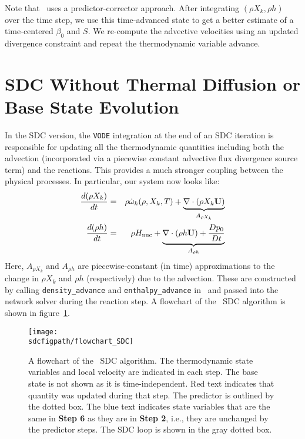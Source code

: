 Note that \maestro\ uses a predictor-corrector approach.  After integrating $(\rho X_k,\rho h)$ over
the time step, we use this time-advanced state to get a better estimate of a time-centered $\beta_0$
and $S$.  We re-compute the advective velocities using an updated divergence constraint and repeat 
the thermodynamic variable advance.

\section{SDC Without Thermal Diffusion or Base State Evolution}
In the SDC version, the {\tt VODE} integration at the end of an SDC
iteration is responsible for updating all the thermodynamic quantities
including both the advection (incorporated via a piecewise constant advective 
flux divergence source term) and the reactions.  This provides a much stronger coupling between
the physical processes.  In particular, our system now looks like:
\begin{eqnarray}
\frac{d(\rho X_k)}{dt} &=& \rho \dot{\omega}_k(\rho,X_k,T) + \underbrace{\nabla\cdot(\rho X_k{\bf U})}_{A_{\rho X_k}}\label{eq:sdc:rhoX} \\
\frac{d(\rho h)}{dt}   &=& \rho {H_{\rm nuc}} + \underbrace{\nabla\cdot(\rho h{\bf U}) + \frac{Dp_0}{Dt}}_{A_{\rho h}} \label{eq:sdc:rhoh}
\end{eqnarray}
Here, $A_{\rho X_k}$ and $A_{\rho h}$ are piecewise-constant (in time)
approximations to the change in ${\rho X_k}$ and ${\rho h}$ (respectively)
due to the advection.  These are constructed by calling {\tt density\_advance}
and {\tt enthalpy\_advance} in \maestro\ and passed into the network solver
during the reaction step.  A flowchart of the \maestro\ SDC algorithm is 
shown in figure~\ref{fig:sdc:flowchart}.

\begin{figure}[tb]
\centering
\texttt{[image: \\sdcfigpath/flowchart\_SDC]}
\caption[Graphical flowchart of \maestro\ SDC]
  {\label{fig:sdc:flowchart} A flowchart of the \maestro\ SDC algorithm.  The
  thermodynamic state variables and local velocity are
  indicated in each step.  The base state is not shown as it is time-independent.
  Red text indicates that quantity was
  updated during that step.  The predictor is 
  outlined by the dotted box.  The blue text indicates state
  variables that are the same in {\bf Step 6} as they are in
  {\bf Step 2}, i.e., they are unchanged by the predictor steps.
  The SDC loop is shown in the gray dotted box.}
\end{figure}


